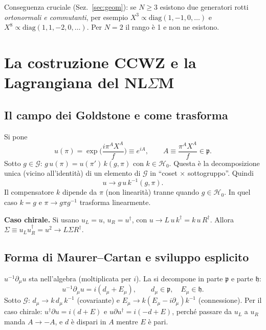 \documentclass[11pt,a4paper]{article}
\numberwithin{equation}{section}
\theoremstyle{remark}
\newcommand{\G}{\mathcal{G}}
\newcommand{\Hg}{\mathcal{H}_0}
\newcommand{\p}{\mathfrak{p}}
\newcommand{\h}{\mathfrak{h}}
\begin{document}
Conseguenza cruciale (Sez.~\ref{sec:geom}): se $N\ge3$ esistono due generatori rotti \emph{ortonormali e commutanti}, per esempio $X^3\propto\mathrm{diag}(1,-1,0,\ldots)$ e $X^8\propto\mathrm{diag}(1,1,-2,0,\ldots)$. Per $N=2$ il rango è 1 e non ne esistono.

\section{La costruzione CCWZ e la Lagrangiana del NL$\Sigma$M}
\label{sec:ccwz}

\subsection{Il campo dei Goldstone e come trasforma}

Si pone
\begin{equation}
u(\pi)=\exp\!\Big(\frac{i\pi^AX^A}{f}\Big)\equiv e^{iA},\qquad A\equiv\frac{\pi^AX^A}{f}\in\p .
\end{equation}
Sotto $g\in\G$: $g\,u(\pi)=u(\pi')\,k(g,\pi)$ con $k\in\Hg$. Questa è la decomposizione unica (vicino all'identità) di un elemento di $\G$ in ``coset $\times$ sottogruppo''. Quindi
\begin{equation}
u\to g\,u\,k^{-1}(g,\pi).
\end{equation}
Il compensatore $k$ dipende da $\pi$ (non linearità) tranne quando $g\in\Hg$. In quel caso $k=g$ e $\pi\to g\pi g^{-1}$ trasforma linearmente.

\textbf{Caso chirale.} Si usano $u_L=u$, $u_R=u^\dagger$, con $u\to L\,u\,k^\dagger=k\,u\,R^\dagger$. Allora $\Sigma\equiv u_Lu_R^\dagger=u^2\to L\Sigma R^\dagger$.

\subsection{Forma di Maurer--Cartan e sviluppo esplicito}

$u^{-1}\partial_\mu u$ sta nell'algebra (moltiplicata per $i$). La si decompone in parte $\p$ e parte $\h$:
\begin{equation}
u^{-1}\partial_\mu u=i(d_\mu+E_\mu),\qquad d_\mu\in\p,\quad E_\mu\in\h .
\end{equation}
Sotto $\G$: $d_\mu\to k\,d_\mu\,k^{-1}$ (covariante) e $E_\mu\to k(E_\mu-i\partial_\mu)k^{-1}$ (connessione). Per il caso chirale: $u^\dagger\partial u=i(d+E)$ e $u\partial u^\dagger=i(-d+E)$, perché passare da $u_L$ a $u_R$ manda $A\to-A$, e $d$ è dispari in $A$ mentre $E$ è pari.
\end{document}
